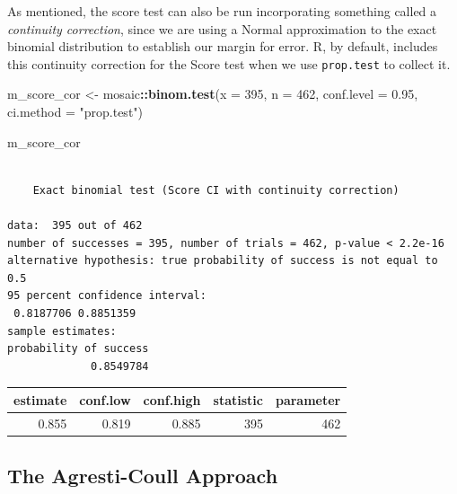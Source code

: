 \documentclass[
]{book}
\newenvironment{Shaded}{\begin{snugshade}}{\end{snugshade}}
\newcommand{\DataTypeTok}[1]{\textcolor[rgb]{0.13,0.29,0.53}{#1}}
\newcommand{\DecValTok}[1]{\textcolor[rgb]{0.00,0.00,0.81}{#1}}
\newcommand{\FloatTok}[1]{\textcolor[rgb]{0.00,0.00,0.81}{#1}}
\newcommand{\KeywordTok}[1]{\textcolor[rgb]{0.13,0.29,0.53}{\textbf{#1}}}
\newcommand{\NormalTok}[1]{#1}
\newcommand{\OperatorTok}[1]{\textcolor[rgb]{0.81,0.36,0.00}{\textbf{#1}}}
\newcommand{\StringTok}[1]{\textcolor[rgb]{0.31,0.60,0.02}{#1}}
\begin{document}
As mentioned, the score test can also be run incorporating something called a \emph{continuity correction}, since we are using a Normal approximation to the exact binomial distribution to establish our margin for error. R, by default, includes this continuity correction for the Score test when we use \texttt{prop.test} to collect it.

\begin{Shaded}
\begin{Highlighting}[]
\NormalTok{m_score_cor <-}\StringTok{ }\NormalTok{mosaic}\OperatorTok{::}\KeywordTok{binom.test}\NormalTok{(}\DataTypeTok{x =} \DecValTok{395}\NormalTok{, }\DataTypeTok{n =} \DecValTok{462}\NormalTok{,}
                                  \DataTypeTok{conf.level =} \FloatTok{0.95}\NormalTok{,}
                                  \DataTypeTok{ci.method =} \StringTok{"prop.test"}\NormalTok{)}

\NormalTok{m_score_cor}
\end{Highlighting}
\end{Shaded}

\begin{verbatim}

	Exact binomial test (Score CI with continuity correction)

data:  395 out of 462
number of successes = 395, number of trials = 462, p-value < 2.2e-16
alternative hypothesis: true probability of success is not equal to 0.5
95 percent confidence interval:
 0.8187706 0.8851359
sample estimates:
probability of success 
             0.8549784 
\end{verbatim}

\begin{Shaded}
\end{Shaded}

\begin{tabular}{r|r|r|r|r}
\hline
estimate & conf.low & conf.high & statistic & parameter\\
\hline
0.855 & 0.819 & 0.885 & 395 & 462\\
\hline
\end{tabular}

\hypertarget{the-agresti-coull-approach}{%
\subsection{The Agresti-Coull Approach}\label{the-agresti-coull-approach}}
\end{document}

